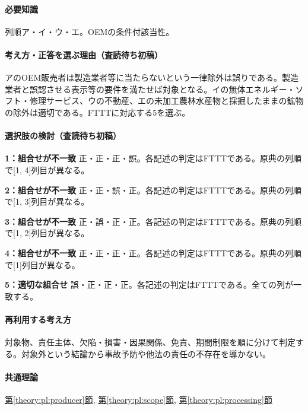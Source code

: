 \paragraph{必要知識} 列順ア・イ・ウ・エ。OEMの条件付該当性。

\paragraph{考え方・正答を選ぶ理由（査読待ち初稿）} アのOEM販売者は製造業者等に当たらないという一律除外は誤りである。製造業者と誤認させる表示等の要件を満たせば対象となる。イの無体エネルギー・ソフト・修理サービス、ウの不動産、エの未加工農林水産物と採掘したままの鉱物の除外は適切である。FTTTに対応する5を選ぶ。

\paragraph{選択肢の検討（査読待ち初稿）}\mbox{}\par

\noindent\textbf{1：組合せが不一致} 正・正・正・誤。各記述の判定はFTTTである。原典の列順で[1, 4]列目が異なる。\par

\noindent\textbf{2：組合せが不一致} 正・正・誤・正。各記述の判定はFTTTである。原典の列順で[1, 3]列目が異なる。\par

\noindent\textbf{3：組合せが不一致} 正・誤・正・正。各記述の判定はFTTTである。原典の列順で[1, 2]列目が異なる。\par

\noindent\textbf{4：組合せが不一致} 正・正・正・正。各記述の判定はFTTTである。原典の列順で[1]列目が異なる。\par

\noindent\textbf{5：適切な組合せ} 誤・正・正・正。各記述の判定はFTTTである。全ての列が一致する。\par

\paragraph{再利用する考え方} 対象物、責任主体、欠陥・損害・因果関係、免責、期間制限を順に分けて判定する。対象外という結論から事故予防や他法の責任の不存在を導かない。

\paragraph{共通理論} \hyperref[theory:pl:producer]{第\ref*{theory:pl:producer}節}, \hyperref[theory:pl:scope]{第\ref*{theory:pl:scope}節}, \hyperref[theory:pl:processing]{第\ref*{theory:pl:processing}節}

